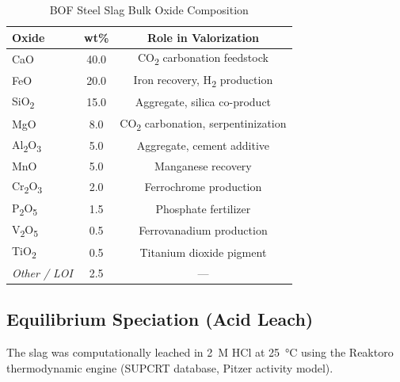 \documentclass[11pt,a4paper]{article}
\begin{document}
\begin{table}[H]
\centering
\caption{BOF Steel Slag Bulk Oxide Composition}
\label{tab:composition}
\begin{tabular}{lcc}
\toprule
\textbf{Oxide} & \textbf{wt\%} & \textbf{Role in Valorization} \\
\midrule
CaO          & 40.0 & CO\textsubscript{2} carbonation feedstock \\
FeO          & 20.0 & Iron recovery, H\textsubscript{2} production \\
SiO\textsubscript{2} & 15.0 & Aggregate, silica co-product \\
MgO          &  8.0 & CO\textsubscript{2} carbonation, serpentinization \\
Al\textsubscript{2}O\textsubscript{3} &  5.0 & Aggregate, cement additive \\
MnO          &  5.0 & Manganese recovery \\
Cr\textsubscript{2}O\textsubscript{3} &  2.0 & Ferrochrome production \\
P\textsubscript{2}O\textsubscript{5} &  1.5 & Phosphate fertilizer \\
V\textsubscript{2}O\textsubscript{5} &  0.5 & Ferrovanadium production \\
TiO\textsubscript{2}  &  0.5 & Titanium dioxide pigment \\
\midrule
\textit{Other / LOI} & 2.5 & --- \\
\bottomrule
\end{tabular}
\end{table}

\subsection{Equilibrium Speciation (Acid Leach)}

The slag was computationally leached in \SI{2}{M} HCl at \SI{25}{\celsius} using the Reaktoro thermodynamic engine (SUPCRT database, Pitzer activity model).
\end{document}
